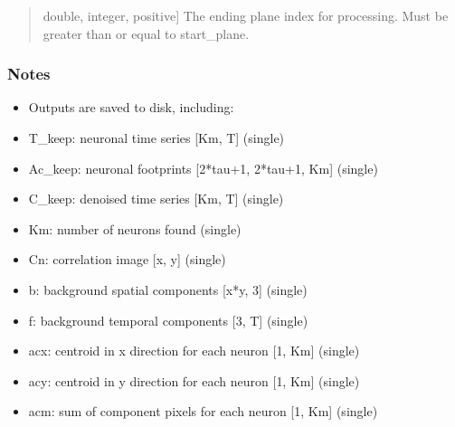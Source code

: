 \documentclass[letterpaper,10pt,english]{sphinxmanual}
\begin{document}
\begin{fulllineitems}
\begin{quote}
\begin{description}
\begin{description}
\sphinxlineitem{\sphinxstylestrong{end\_plane}}{[}double, integer, positive{]}
\sphinxAtStartPar
The ending plane index for processing. Must be greater than or equal to
start\_plane.

\end{description}

\begin{description}
\end{description}

\end{description}\end{quote}
\subsubsection*{Notes}
\begin{itemize}
\item {} 
\sphinxAtStartPar
Outputs are saved to disk, including:

\item {} 
\sphinxAtStartPar
T\_keep: neuronal time series {[}Km, T{]} (single)

\item {} 
\sphinxAtStartPar
Ac\_keep: neuronal footprints {[}2*tau+1, 2*tau+1, Km{]} (single)

\item {} 
\sphinxAtStartPar
C\_keep: denoised time series {[}Km, T{]} (single)

\item {} 
\sphinxAtStartPar
Km: number of neurons found (single)

\item {} 
\sphinxAtStartPar
Cn: correlation image {[}x, y{]} (single)

\item {} 
\sphinxAtStartPar
b: background spatial components {[}x*y, 3{]} (single)

\item {} 
\sphinxAtStartPar
f: background temporal components {[}3, T{]} (single)

\item {} 
\sphinxAtStartPar
acx: centroid in x direction for each neuron {[}1, Km{]} (single)

\item {} 
\sphinxAtStartPar
acy: centroid in y direction for each neuron {[}1, Km{]} (single)

\item {} 
\sphinxAtStartPar
acm: sum of component pixels for each neuron {[}1, Km{]} (single)


\end{itemize}
\end{fulllineitems}
\end{document}
